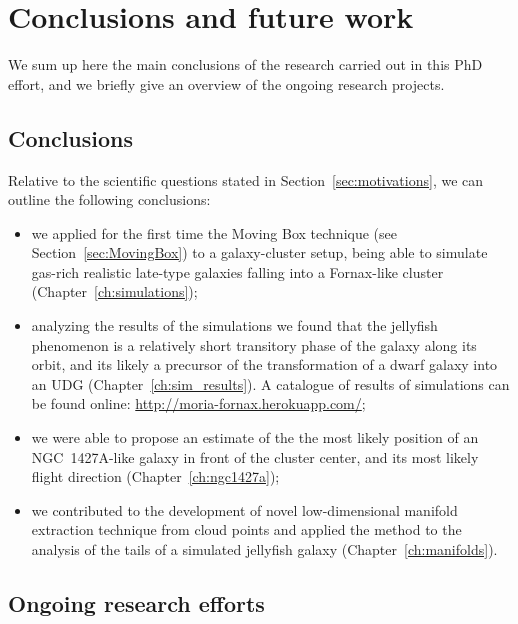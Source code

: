 
\chapter{Conclusions and future work}
\label{ch:conclusions}
We sum up here the main conclusions of the research carried out in this PhD effort, and we briefly give an overview of the ongoing research projects.\\[5ex]


\section{Conclusions}
Relative to the scientific questions stated in Section~\ref{sec:motivations}, we can outline the following conclusions:

\begin{itemize}
  \item we applied for the first time the Moving Box technique (see Section~\ref{sec:MovingBox}) to a galaxy-cluster setup, being able to simulate gas-rich realistic late-type galaxies falling into a Fornax-like cluster (Chapter~\ref{ch:simulations});
  \item analyzing the results of the simulations we found that the jellyfish phenomenon is a relatively short transitory phase of the galaxy along its orbit, and its likely a precursor of the transformation of a dwarf galaxy into an UDG (Chapter~\ref{ch:sim_results}).
  A catalogue of results of simulations can be found online: \url{http://moria-fornax.herokuapp.com/};
  \item we were able to propose an estimate of the the most likely position of an NGC~1427A-like galaxy in front of the cluster center, and its most likely flight direction (Chapter~\ref{ch:ngc1427a});
  \item we contributed to the development of novel low-dimensional manifold extraction technique from cloud points and applied the method to the analysis of the tails of a simulated jellyfish galaxy (Chapter~\ref{ch:manifolds}).
\end{itemize}

\section{Ongoing research efforts}
